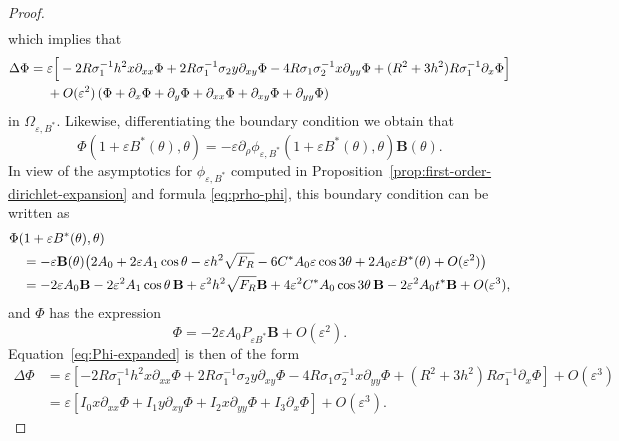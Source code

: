 \documentclass[12pt,reqno]{amsart}
\numberwithin{equation}{section}
\theoremstyle{definition}
\theoremstyle{remark}
\begin{document}
\begin{proof}
\begin{equation*}
\begin{split}
\end{split}
\end{equation*}
which implies that
\begin{align}\label{eq:Phi-expanded}
\Delta\Phi={}&\varepsilon\Big[-2R\sigma_1^{-1}h^2x\partial_{xx}\Phi
+2 R\sigma_1^{-1}\sigma_2y\partial_{xy}\Phi
-4R\sigma_1\sigma_2^{-1}x\partial_{yy}\Phi +(R^2+3h^2)R\sigma_1^{-1}\partial_x\Phi\Big] \notag\\
&
+O(\varepsilon^2)\left (\Phi+\partial_{x}\Phi+\partial_{y}\Phi+\partial_{xx}\Phi+\partial_{xy}\Phi+\partial_{yy}\Phi\right )
\end{align} 
in $ \varOmega_{\varepsilon,B^*} $. 	Likewise, differentiating the boundary condition we obtain that 
\begin{equation*} 
 \Phi(1+\varepsilon B^*(\theta),\theta)
=-\varepsilon\partial_\rho\phi_{\varepsilon,B^*}(1+\varepsilon B^*(\theta),\theta)\mathbf{B}(\theta) .
\end{equation*}
In view of the asymptotics for $ \phi_{\varepsilon,B^*}$ computed in Proposition~\ref{prop:first-order-dirichlet-expansion} and formula \eqref{eq:prho-phi}, this boundary condition can be written as 
 \begin{align*}%
 &\Phi(1+\varepsilon B^*(\theta),\theta)\notag\\
 &\quad=-\varepsilon \textbf{B}(\theta)\bigl(2A_0+2\varepsilon A_1\cos\theta-\varepsilon h^2\sqrt{F_R}-6C^*A_0\varepsilon \cos3\theta+2A_0\varepsilon B^*(\theta)+O(\varepsilon^2)\bigr)\notag\\
 &\quad=-2\varepsilon A_0  \textbf{B}-2\varepsilon^2A_1\cos\theta\, \textbf{B}
 +\varepsilon^2h^2\sqrt{F_R} \textbf{B}+4\varepsilon^2C^*A_0\cos3\theta\, \textbf{B}-2\varepsilon^2A_0 t^*\textbf{B}+O(\varepsilon^3),
 \end{align*}
and  $ \Phi $ has the expression
 \begin{equation*}\label{eq:Phi-leading}
 \Phi=-2\varepsilon A_0P_{\varepsilon B^*} \textbf{B}+O(\varepsilon^2).
 \end{equation*}
 Equation~\eqref{eq:Phi-expanded} is then of the form
\begin{align*} 
\Delta\Phi&=\varepsilon\left [-2R\sigma_1^{-1}h^2x\partial_{xx}\Phi
+2 R\sigma_1^{-1}\sigma_2y\partial_{xy}\Phi
-4R\sigma_1\sigma_2^{-1}x\partial_{yy}\Phi +(R^2+3h^2)R\sigma_1^{-1}\partial_x\Phi\right ]  
+O(\varepsilon^3)\\
&=\varepsilon\left [I_0x\partial_{xx}\Phi
+I_1y\partial_{xy}\Phi
+I_2x\partial_{yy}\Phi +I_3\partial_x\Phi\right ]  
+O(\varepsilon^3).

\end{align*}
\end{proof}
\end{document}
